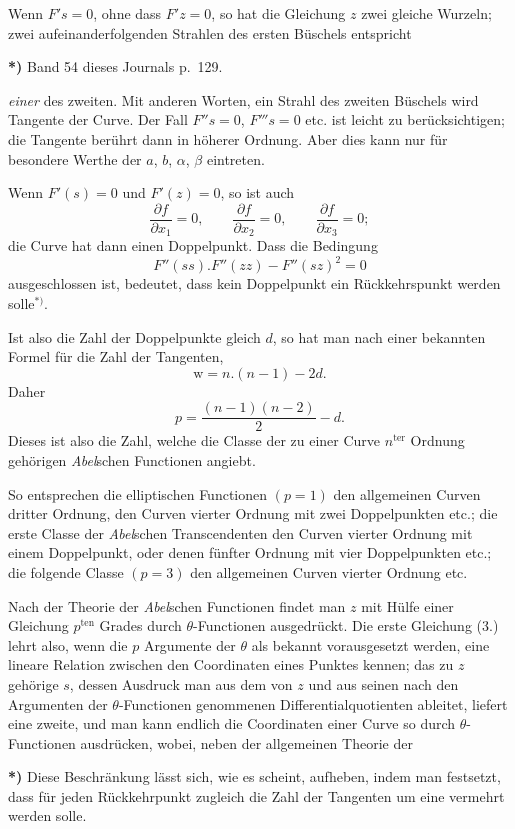 \documentclass{article}
\begin{document}
Wenn $F's = 0$, ohne dass $F'z = 0$, so hat die Gleichung $z$ zwei gleiche Wurzeln; zwei aufeinanderfolgenden Strahlen des ersten Büschels entspricht

\textbf{*)} Band 54 dieses Journals p.\ 129.

\emph{einer} des zweiten. Mit anderen Worten, ein Strahl des zweiten Büschels wird Tangente der Curve. Der Fall $F''s = 0$, $F'''s = 0$ etc. ist leicht zu berücksichtigen; die Tangente berührt dann in höherer Ordnung. Aber dies kann nur für besondere Werthe der $a$, $b$, $\alpha$, $\beta$ eintreten.

Wenn $F'(s) = 0$ und $F'(z) = 0$, so ist auch
\[ \frac{\partial f}{\partial x_{1}} = 0, \qquad \frac{\partial f}{\partial x_{2}} = 0, \qquad \frac{\partial f}{\partial x_{3}} = 0; \]
die Curve hat dann einen Doppelpunkt. Dass die Bedingung
\[ F''(ss).F''(zz) - F''(sz)^{2} = 0 \]
ausgeschlossen ist, bedeutet, dass kein Doppelpunkt ein Rückkehrspunkt werden solle${}^{*)}$.

Ist also die Zahl der Doppelpunkte gleich $d$, so hat man nach einer bekannten Formel für die Zahl der Tangenten,
\[ \mathrm{w} = n.(n-1) - 2d. \]
Daher
\[ p = \frac{(n-1)(n-2)}{2} - d. \tag{4.} \]
Dieses ist also die Zahl, welche die Classe der zu einer Curve $n^{\text{ter}}$ Ordnung gehörigen \emph{Abel}schen Functionen angiebt.

So entsprechen die elliptischen Functionen $(p = 1)$ den allgemeinen Curven dritter Ordnung, den Curven vierter Ordnung mit zwei Doppelpunkten etc.; die erste Classe der \emph{Abel}schen Transcendenten den Curven vierter Ordnung mit einem Doppelpunkt, oder denen fünfter Ordnung mit vier Doppelpunkten etc.; die folgende Classe $(p = 3)$ den allgemeinen Curven vierter Ordnung etc.

Nach der Theorie der \emph{Abel}schen Functionen findet man $z$ mit Hülfe einer Gleichung $p^{\text{ten}}$ Grades durch $\theta$-Functionen ausgedrückt. Die erste Gleichung (3.) lehrt also, wenn die $p$ Argumente der $\theta$ als bekannt vorausgesetzt werden, eine lineare Relation zwischen den Coordinaten eines Punktes kennen; das zu $z$ gehörige $s$, dessen Ausdruck man aus dem von $z$ und aus seinen nach den Argumenten der $\theta$-Functionen genommenen Differentialquotienten ableitet, liefert eine zweite, und man kann endlich die Coordinaten einer Curve so durch $\theta$-Functionen ausdrücken, wobei, neben der allgemeinen Theorie der

\textbf{*)} Diese Beschränkung lässt sich, wie es scheint, aufheben, indem man festsetzt, dass für jeden Rückkehrpunkt zugleich die Zahl der Tangenten um eine vermehrt werden solle.
\end{document}
